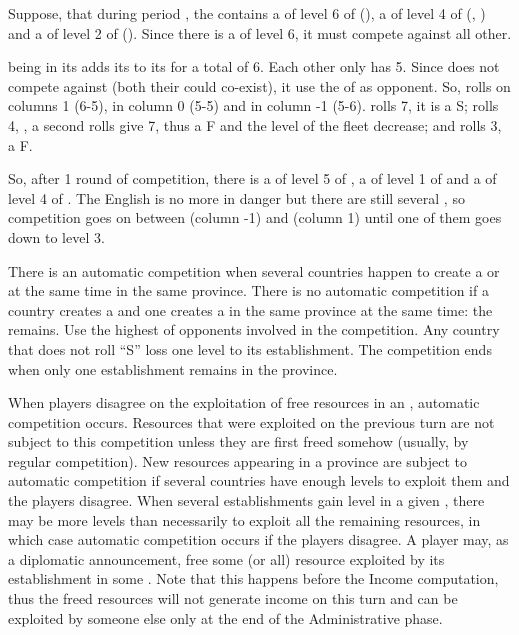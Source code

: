 \begin{exemple}
  Suppose, that during period , the  contains a
  \TradeFLEET of level 6 of \HOL (), a \TradeFLEET of level 4 of \FRA
  (, ) and a \TradeFLEET of level 2 of \ANG (). Since there
  is a \TradeFLEET of level 6, it must compete against all other.

  \FRA being in its \CTZ adds its \DTI to its \FTI for a total of 6. Each
  other only has 5. Since \ANG does not compete against \FRA (both their
  \TradeFLEET could co-exist), it use the \FTI of \HOL as opponent. So, \FRA
  rolls on columns 1 (6-5), \ANG in column 0 (5-5) and \HOL in column -1
  (5-6). \FRA rolls 7, it is a S; \ANG rolls 4, \undemi, a second rolls give
  7, thus a F and the level of the fleet decrease; and \HOL rolls 3, a F.

  So, after 1 round of competition, there is a \TradeFLEET of level 5 of \HOL,
  a \TradeFLEET of level 1 of \ANG and a \TradeFLEET of level 4 of \FRA. The
  English \TradeFLEET is no more in danger but there are still several
  \TradeFLEET\Faceplus, so competition goes on between \HOL (column -1) and
  \FRA (column 1) until one of them goes down to level 3.
\end{exemple}

 There is an automatic competition when
several countries happen to create a \COL or \TP at the same time in the same
province.
\bparag There is no automatic competition if a country creates a \COL and one
creates a \TP in the same province at the same time: the \COL remains.
\bparag Use the highest \FTI of opponents involved in the competition.
\bparag Any country that does not roll ``S'' loss one level to its
establishment.
\bparag The competition ends when only one establishment remains in the
province.

 When players disagree on the exploitation of
free resources in an \Area, automatic competition occurs.
\bparag Resources that were exploited on the previous turn are not subject to
this competition unless they are first freed somehow (usually, by regular
competition).
\bparag New resources appearing in a province are subject to automatic
competition if several countries have enough levels to exploit them and the
players disagree.
\bparag When several establishments gain level in a given \Area, there may be
more levels than necessarily to exploit all the remaining resources, in which
case automatic competition occurs if the players disagree.
\bparag A player may, as a diplomatic announcement, free some (or all)
resource exploited by its establishment in some \Area. Note that this happens
before the Income computation, thus the freed resources will not generate
income on this turn and can be exploited by someone else only at the end of
the Administrative phase.

